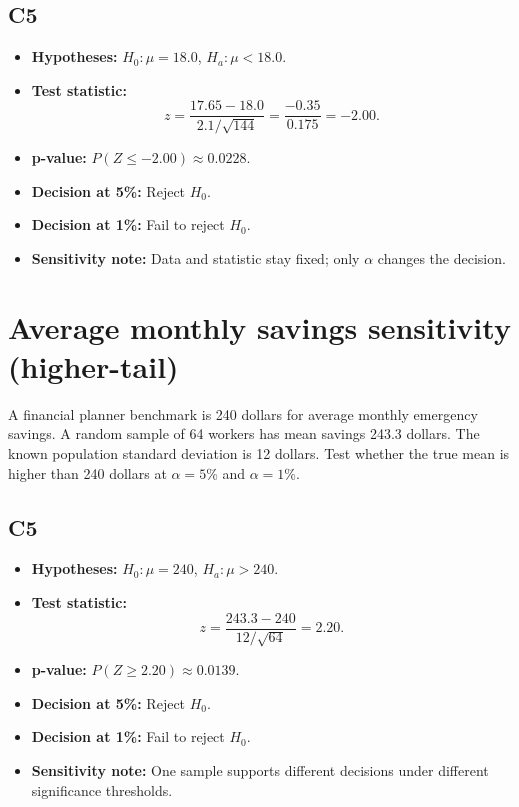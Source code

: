 \subsection*{C5}
\begin{itemize}
    \item \textbf{Hypotheses:} \(H_0\colon \mu=18.0\), \(H_a\colon \mu<18.0\).
    \item \textbf{Test statistic:}
    \[
    z=\frac{17.65-18.0}{2.1/\sqrt{144}}=\frac{-0.35}{0.175}=-2.00.
    \]
    \item \textbf{p-value:} \(P(Z\le -2.00)\approx 0.0228\).
    \item \textbf{Decision at 5\%:} Reject \(H_0\).
    \item \textbf{Decision at 1\%:} Fail to reject \(H_0\).
    \item \textbf{Sensitivity note:} Data and statistic stay fixed; only \(\alpha\) changes the decision.
\end{itemize}

\begin{center}
\hspace{0.8cm}
\end{center}

\section{Average monthly savings sensitivity (higher-tail)}
A financial planner benchmark is 240 dollars for average monthly emergency savings. A random sample of 64 workers has mean savings 243.3 dollars. The known population standard deviation is 12 dollars. Test whether the true mean is higher than 240 dollars at \(\alpha=5\%\) and \(\alpha=1\%\).

\subsection*{C5}
\begin{itemize}
    \item \textbf{Hypotheses:} \(H_0\colon \mu=240\), \(H_a\colon \mu>240\).
    \item \textbf{Test statistic:}
    \[
    z=\frac{243.3-240}{12/\sqrt{64}}=2.20.
    \]
    \item \textbf{p-value:} \(P(Z\ge 2.20)\approx 0.0139\).
    \item \textbf{Decision at 5\%:} Reject \(H_0\).
    \item \textbf{Decision at 1\%:} Fail to reject \(H_0\).
    \item \textbf{Sensitivity note:} One sample supports different decisions under different significance thresholds.
\end{itemize}

